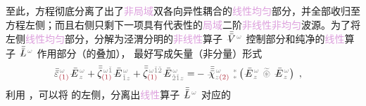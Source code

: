 至此，方程彻底分离了出了\textcolor{Plum}{非局域}\textcolor{PineGreen}{双各向异性}耦合的\textcolor{Plum}{线性}\textcolor{Plum}{均匀}部分，并全部收归至方程左侧；而且右侧只剩下一项具有代表性的\textcolor{Plum}{局域}二阶\textcolor{Plum}{非线性}\textcolor{Plum}{非均匀}\textcolor{NavyBlue}{波源}。为了将左侧\textcolor{Plum}{线性}\textcolor{Plum}{均匀}部分，分解为泾渭分明的\textcolor{Plum}{非线性}算子 $\Xint{\mathcolor{gray}{-}}{21}{\bar{\bar{V}}}^{\;\! \mathcolor{gray}{\omega}}$ 控制部分和纯净的\textcolor{Plum}{线性}算子 $\Xint{\mathcolor{gray}{-}}{30}{\bar{\bar{L}}}^{\;\! \mathcolor{gray}{\omega}}$ 作用部分（的叠加）， 最好写成矢量（非分量）形式
\begin{align} \label{eq:nonlinear(2)-wave_wkrho-simplify5-vector}
	\bar{\bar{\varepsilon}}^{\;\! \mathcolor{gray}{\omega}}_{\textcolor{Maroon}{(1)}} \Xint{\mathcolor{gray}{-}}{295}{\bar{E}}^{\;\!\mathcolor{gray}{\omega}}_{\;\! \mathcolor{gray}{z}} + \bar{\bar{\zeta}}^{\;\! \mathcolor{gray}{\omega} \mathcolor{gray}{\check{1}}}_{\textcolor{Maroon}{(1)}} \Xint{\mathcolor{gray}{-}}{295}{\bar{E}}^{\;\!\mathcolor{gray}{\omega}}_{\;\! \mathcolor{gray}{\check{1}} \mathcolor{gray}{z}} + \bar{\bar{\zeta}}^{\;\! \mathcolor{gray}{\omega} \mathcolor{gray}{\check{1} \check{2}}}_{\textcolor{Maroon}{(1)}} \Xint{\mathcolor{gray}{-}}{295}{\bar{E}}^{\;\!\mathcolor{gray}{\omega}}_{\;\! \mathcolor{gray}{\check{2} \check{1}} \mathcolor{gray}{z}}
	= &- \Xint{{}^{}_{\mathcolor{gray}{-}}}{23}{\bar{\bar{\bar{\chi}}}}^{\;\! \mathcolor{gray}{\omega}}_{\mathcolor{gray}{z} \textcolor{Maroon}{(2)}} ~{}^{\mathcolor{gray}{*}}_{\mathcolor{gray}{*}} \left( \Xint{\mathcolor{gray}{-}}{295}{\bar{E}}^{\;\!\mathcolor{gray}{\omega}}_{\;\! \mathcolor{gray}{z}} ~\mathcolor{gray}{\widetilde \circledast}~ \Xint{\mathcolor{gray}{-}}{295}{\bar{E}}^{\;\!\mathcolor{gray}{\omega}}_{\;\! \mathcolor{gray}{z}} \right) ~,
\end{align}
利用 ，可以将  的左侧，分离出\textcolor{Plum}{线性}算子 $\Xint{\mathcolor{gray}{-}}{30}{\bar{\bar{L}}}^{\;\! \mathcolor{gray}{\omega}}$ 对应的
